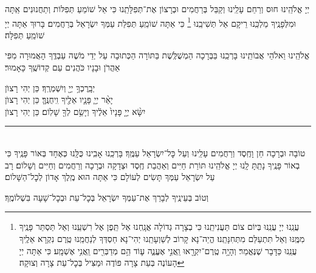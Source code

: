 \documentclass[twoside, openany, parskip=half, 11pt]{book}
\begin{document}
\weekdaysamalchus

יְיָ אֱלֹהֵֽינוּ חוּס וְרַחֵם עָלֵֽינוּ וְקַבֵּל בְּרַחֲמִים וּבְרָצוֹן אֶת־תְּפִלָּתֵֽנוּ כִּי אֵל שׁוֹמֵעַ תְּפִלּוֹת וְתַחֲנוּנִים אַֽתָּה וּמִלְּפָנֶֽיךָ מַלְכֵּֽנוּ רֵיקָם אַל תְּשִׁיבֵֽנוּ
\footnote{
עֲנֵֽנוּ יְיָ עֲנֵֽנוּ בְּיוֹם צוֹם תַּעֲנִיתֵֽנוּ כִּי בְצָרָה גְדוֹלָה אֲנָֽחְנוּ אַל תֵּֽפֶן אֶל רִשְׁעֵֽנוּ וְאַל תַּסְתֵּר פָּנֶֽיךָ מִמֶּֽנּוּ וְאַל תִּתְעַלַּם מִתְּחִנָּתֵֽנוּ׃ הֱיֵה־נָא קָרוֹב לְשַׁוְעָתֵֽנוּ יְהִי־נָא חַסְדְּךָ לְנַחֲמֵֽנוּ טֶֽרֶם נִקְרָא אֵלֶֽיךָ עֲנֵֽנוּ כַּדָּבָר שֶׁנֶּאֱמַר׃
וְהָיָ֥ה טֶֽרֶם־יִקְרָ֖אוּ וַֽאֲנִ֣י אֶעֱנֶ֑ה ע֛וֹד הֵ֥ם מְדַבְּרִ֖ים וַֽאֲנִ֥י אֶשְׁמָֽע׃ כִּי אַתָּה יְיָ הָעוֹנֶה בְּעֵת צָרָה פּוֹדֶה וּמַצִּיל בְּכׇל־עֵת צָרָה וְצוּקָה׃
}
כִּי אַתָּה שׁוֹמֵֽעַ תְּפִלַּת עַמְּךָ יִשְׂרָאֵל בְּרַחֲמִים׃ בָּרוּךְ אַתָּה יְיָ שׁוֹמֵֽעַ תְּפִלָּה׃

\retzeh

\yaalehveyavo

\zion

\modim

\alhanisim

\weekdaysahodos

אֱלֹהֵֽינוּ וֵאלֹהֵי אֲבוֹתֵֽינוּ בָּרְכֵֽנוּ בַּבְּרָכָה הַמְשֻׁלֶּֽשֶׁת בַּתּוֹרָה
הַכְּתוּבָה עַל יְדֵי מֹשֶׁה עַבְדֶּֽךָ הָאֲמוּרָה מִפִּי אַהֲרֹן וּבָנָיו כֹּהֲנִים עַם קְדוֹשֶֽׁךָ כָּאָמוּר׃

יְבָֽרֶכְךָ֥ יְיָ֖ וְיִשְׁמְרֶֽךָ׃ \hfill \kahal כֵּן יְהִי רָצוׂן \\
יָאֵ֨ר יְיָ֧ פָּנָ֛יו אֵלֶ֖יךָ וִֽיחֻנֶּֽךָּ׃ \hfill \kahal כֵּן יְהִי רָצוׂן \\
יִשָּׂ֨א יְיָ֤ פָּנָיו֙ אֵלֶ֔יךָ וְיָשֵׂ֥ם לְךָ֖ שָׁלֽוֹם׃ \hfill \kahal כֵּן יְהִי רָצוׂן

\rule[-0.5ex]{3in}{1pt}

\begin{paracol}{2}
\\
טוֹבָה וּבְרָכָה חֵן וָחֶֽסֶד וְרַחֲמִים עָלֵֽינוּ וְעַל כׇּל־יִשְׂרָאֵל עַמֶּֽךָ׃ בָּרְכֵֽנוּ אָבִֽינוּ כֻּלָּֽנוּ כְּאֶחָד בְּאוֹר פָּנֶֽיךָ כִּי בְאוֹר פָּנֶֽיךָ נָתַֽתָּ לָֽנוּ יְיָ אֱלֹהֵֽינוּ תּוֹרַת חַיִּים וְאַהֲבַת חֶֽסֶד וּצְדָקָה וּבְרָכָה וְרַחֲמִים וְחַיִּים וְשָׁלוֹם׃
\switchcolumn
{}
רָב עַל יִשְׂרָאֵל עַמְּךָ תָּשִׂים לְעוֹלָם כִּי אַתָּה הוּא מֶֽלֶךְ אָדוֹן לְכׇל־הַשָּׁלוֹם׃
\end{paracol}
וְטוֹב בְּעֵינֶֽיךָ לְבָרֵךְ אֶת־עַמְּךָ יִשְׂרָאֵל בְּכׇל־עֵת וּבְכׇל־שָׁעָה בִּשְׁלוֹמֶֽךָ׃
\end{document}
